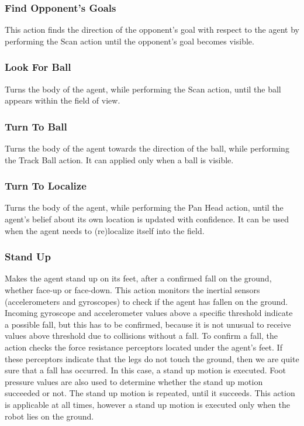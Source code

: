 \subsubsection*{Find Opponent's Goals} 
This action finds the direction of the opponent's goal with respect to the agent by performing the Scan action until the opponent's goal becomes visible.

\subsubsection*{Look For Ball} 
Turns the body of the agent, while performing the Scan action, until the ball appears within the field of view.
 
\subsubsection*{Turn To Ball} 
Turns the body of the agent towards the direction of the ball, while performing the Track Ball action. It can applied only when a ball is visible.
 
\subsubsection*{Turn To Localize} 
Turns the body of the agent, while performing the Pan Head action, until the agent's belief about its own location is updated with confidence. It can be used when the agent needs to (re)localize itself into the field.

\subsubsection*{Stand Up} 
Makes the agent stand up on its feet, after a confirmed fall on the ground, whether face-up or face-down. This action monitors the inertial sensors (accelerometers and gyroscopes) to check if the agent has fallen on the ground. Incoming gyroscope and accelerometer values above a specific threshold indicate a possible fall, but this has to be confirmed, because it is not unusual to receive values above threshold due to collisions without a fall. To confirm a fall, the action checks the force resistance perceptors located under the agent's feet. If these perceptors indicate that the legs do not touch the ground, then we are quite sure that a fall has occurred. In this case, a stand up motion is executed. Foot pressure values are also used to determine whether the stand up motion succeeded or not. The stand up motion is repeated, until it succeeds. This action is applicable at all times, however a stand up motion is executed only when the robot lies on the ground. 

